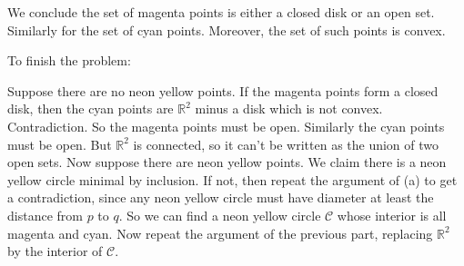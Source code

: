 \begin{problem}
\begin{sol}
		We conclude the set of magenta points is
		either a closed disk or an open set.
		Similarly for the set of cyan points.
		Moreover, the set of such points is convex.

		To finish the problem:
		\begin{itemize}
		\ii Suppose there are no neon yellow points.
		If the magenta points form a closed disk,
		then the cyan points are $\mathbb R^2$ minus a disk which is not convex.
		Contradiction. So the magenta points must be open.
		Similarly the cyan points must be open.
		But $\mathbb R^2$ is connected,
		so it can't be written as the union of two open sets.
		\ii Now suppose there are neon yellow points.
		We claim there is a neon yellow circle minimal by inclusion.
		If not, then repeat the argument of (a) to get a contradiction,
		since any neon yellow circle must have diameter at least the distance from $p$ to $q$.
		So we can find a neon yellow circle $\mathscr C$ whose
		interior is all magenta and cyan.
		Now repeat the argument of the previous part,
		replacing $\mathbb R^2$ by the interior of $\mathscr C$.
		 \end{itemize}
	\end{sol}
\end{problem}
